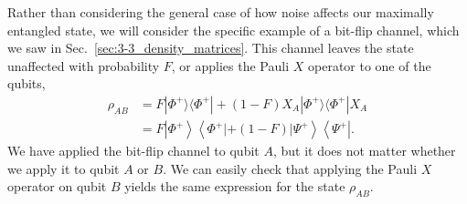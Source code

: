 Rather than considering the general case of how noise affects our maximally entangled state, we will consider the specific example of a bit-flip channel, which we saw in Sec.~\ref{sec:3-3_density_matrices}.
This channel leaves the state unaffected with probability $F$, or applies the Pauli $X$ operator to one of the qubits,
\begin{align}
    \rho_{AB} & = F|\Phi^{+}\rangle\langle\Phi^{+}|+(1-F) X_A| \Phi^{+}\rangle\langle\Phi^{+}| X_A \nonumber\\
    & = F \left|\Phi^{+}\right\rangle\left\langle\Phi^{+}|+(1-F)| \Psi^{+}\right\rangle\left\langle\Psi^{+}\right|.
    \label{eq:12-4_bitflip_mixed_state}
\end{align}
We have applied the bit-flip channel to qubit $A$, but it does not matter whether we apply it to qubit $A$ or $B$.
We can easily check that applying the Pauli $X$ operator on qubit $B$ yields the same expression for the state $\rho_{AB}$.

